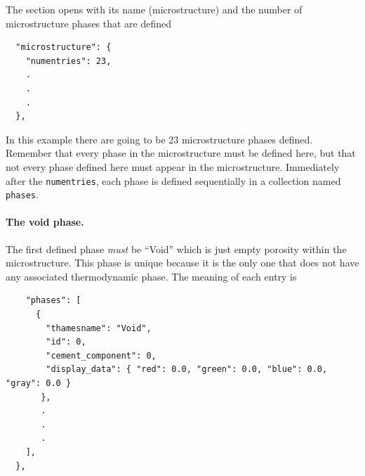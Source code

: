\documentclass{article}
\begin{document}
The section opens with its name (microstructure) and the number
of microstructure phases that are defined
\scriptsize{
\begin{lstlisting}
  "microstructure": {
    "numentries": 23,
    .
    .
    .
  },
\end{lstlisting}

\normalsize{ }
In this example there are going to be 23 microstructure phases
defined. Remember that every phase in the microstructure must be
defined here, but that not every phase defined here must appear
in the microstructure.
Immediately after the \verb!numentries!, each phase is
defined sequentially in a collection named \verb!phases!.

\paragraph{The void phase.} The first defined phase \textit{must} be ``Void'' which
is just empty porosity within the microstructure. This phase is unique
because it is the only one that does not have any associated thermodynamic
phase. The meaning of each entry is
\scriptsize{
	\begin{lstlisting}
    "phases": [
      {
        "thamesname": "Void",
        "id": 0,
        "cement_component": 0,
        "display_data": { "red": 0.0, "green": 0.0, "blue": 0.0, "gray": 0.0 }
       },
       .
       .
       .
    ],
  },
\end{lstlisting}
}

}
\end{document}
